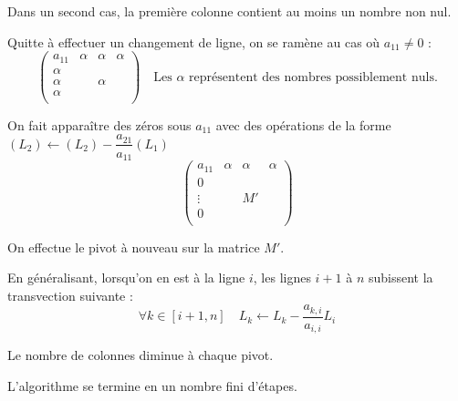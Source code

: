 Dans un second cas, la première colonne contient au moins un nombre non nul.

 Quitte à effectuer un changement de ligne, on se ramène au cas où $a_{11}\neq 0$ :
 $$
 \left(
 \begin{array}{c|ccc}
 a_{11} & \alpha & \alpha & \alpha \\
\hline
\alpha  & & & \\
\alpha  & & \alpha & \\
\alpha  & & & \\
\end{array}
 \right) \quad 
 \text{Les } \alpha \text{ représentent des nombres possiblement nuls.}
 $$ 

 On fait apparaître des zéros sous $a_{11}$ avec des opérations de la forme $(L_2)\leftarrow (L_2)-\dfrac{a_{21}}{a_{11}}(L_1)$ 
 $$
 \left(
 \begin{array}{c|ccc}
 a_{11} & \alpha & \alpha & \alpha \\
\hline
0  & & & \\
\vdots  & & M'& \\
0  & & & \\
\end{array}
 \right) 
 $$ 
 
 On effectue le pivot  à nouveau sur la matrice $M'$.
 
 En généralisant, lorsqu'on en est à la ligne $i$, les lignes $i+1$ à $n$ subissent la transvection suivante : 
 $$
 \forall k \in[i+1,n] \quad L_{k}\leftarrow L_k - \dfrac{a_{k,i}}{a_{i,i}}L_i
 $$
 
 \begin{rem}
 Le nombre de colonnes diminue à chaque pivot.
 
 L'algorithme se termine en un nombre fini d'étapes.
 \end{rem}


